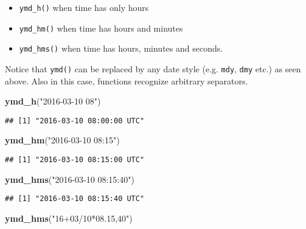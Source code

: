 \documentclass[]{book}
\newenvironment{Shaded}{\begin{snugshade}}{\end{snugshade}}
\newcommand{\KeywordTok}[1]{\textcolor[rgb]{0.13,0.29,0.53}{\textbf{{#1}}}}
\newcommand{\StringTok}[1]{\textcolor[rgb]{0.31,0.60,0.02}{{#1}}}
\newcommand{\NormalTok}[1]{{#1}}
\providecommand{\tightlist}{%
  \setlength{\itemsep}{0pt}\setlength{\parskip}{0pt}}
\def\tightlist{}
\begin{document}
\begin{itemize}
\tightlist
\item
  \texttt{ymd\_h()} when time has only hours
\item
  \texttt{ymd\_hm()} when time has hours and minutes
\item
  \texttt{ymd\_hms()} when time has hours, minutes and seconds.
\end{itemize}

Notice that \texttt{ymd()} can be replaced by any date style (e.g.
\texttt{mdy}, \texttt{dmy} etc.) as seen above. Also in this case,
functions recognize arbitrary separators.

\begin{Shaded}
\begin{Highlighting}[]
\KeywordTok{ymd_h}\NormalTok{(}\StringTok{"2016-03-10 08"}\NormalTok{)}
\end{Highlighting}
\end{Shaded}

\begin{verbatim}
## [1] "2016-03-10 08:00:00 UTC"
\end{verbatim}

\begin{Shaded}
\begin{Highlighting}[]
\KeywordTok{ymd_hm}\NormalTok{(}\StringTok{"2016-03-10 08:15"}\NormalTok{)}
\end{Highlighting}
\end{Shaded}

\begin{verbatim}
## [1] "2016-03-10 08:15:00 UTC"
\end{verbatim}

\begin{Shaded}
\begin{Highlighting}[]
\KeywordTok{ymd_hms}\NormalTok{(}\StringTok{"2016-03-10 08:15:40"}\NormalTok{)}
\end{Highlighting}
\end{Shaded}

\begin{verbatim}
## [1] "2016-03-10 08:15:40 UTC"
\end{verbatim}

\begin{Shaded}
\begin{Highlighting}[]
\KeywordTok{ymd_hms}\NormalTok{(}\StringTok{"16+03/10*08.15,40"}\NormalTok{)}
\end{Highlighting}
\end{Shaded}
\end{document}
